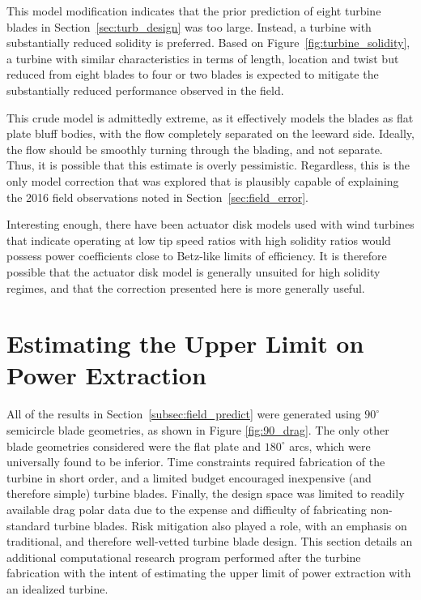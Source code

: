 This model modification indicates that the prior prediction of eight
turbine blades in Section~\ref{sec:turb_design} was too large. Instead,
a turbine with substantially reduced solidity is preferred. Based on
Figure~\ref{fig:turbine_solidity}, a turbine with similar
characteristics in terms of length, location and twist but reduced from
eight blades to four or two blades is expected to mitigate the
substantially reduced performance observed in the field. 

This crude model is admittedly extreme, as it effectively models the
blades as flat plate bluff bodies, with the flow completely
separated on the leeward side. Ideally, the flow should be smoothly
turning through the blading, and not separate. Thus, it is possible that
this estimate is overly pessimistic. Regardless, this is the only model
correction that was explored that is plausibly capable of explaining the
2016 field observations noted in Section~\ref{sec:field_error}. 

Interesting enough, there have been actuator disk models used with wind
turbines that indicate operating at low tip speed ratios with high
solidity ratios would possess power coefficients close to Betz-like
limits of efficiency\cite{WE:WE118}. It is therefore possible that the
actuator disk model is generally unsuited for high solidity regimes, and
that the correction presented here is more generally useful. 


\section{Estimating the Upper Limit on Power Extraction}
\label{sec:peak_estimate}

All of the results in Section~\ref{subsec:field_predict} were generated
using $90^{\circ}$ semicircle blade geometries, as shown in Figure
\ref{fig:90_drag}. The only other blade geometries considered were the
flat plate and $180^{\circ}$ arcs, which were universally found to be
inferior. Time constraints required fabrication of the turbine in short
order, and a limited budget encouraged inexpensive (and therefore
simple) turbine blades. Finally, the design space was limited to
readily available drag polar data due to the expense and difficulty of 
fabricating non-standard turbine blades. Risk mitigation also played a
role, with an emphasis on traditional, and therefore well-vetted turbine
blade design. %
This section details an additional computational research program
performed after the turbine fabrication with the intent of estimating
the upper limit of power extraction with an idealized turbine. 

